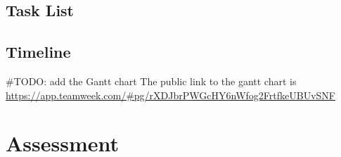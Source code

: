 \subsection{Task List}


\subsection{Timeline}
\#TODO: add the Gantt chart
The public link to the gantt chart is \url{https://app.teamweek.com/#pg/rXDJbrPWGcHY6nWfog2FrtfkeUBUvSNF}

\section{Assessment}